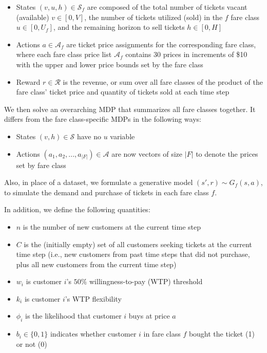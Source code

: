 \documentclass[10pt,letterpaper]{article}
\begin{document}
\begin{multicols*}{2}
\begin{itemize}
    \item States $(v, u, h) \in \mathcal{S}_f$ are composed of the total number of tickets vacant (available) $v \in [0,V]$, the number of tickets utilized (sold) in the $f$ fare class $u \in [0,U_f]$, and the remaining horizon to sell tickets $h \in [0,H]$
    \item Actions $a \in \mathcal{A}_f$ are ticket price assignments for the corresponding fare class, where each fare class price list $\mathcal{A}_f$ contains 30 prices in increments of \$10 with the upper and lower price bounds set by the fare class
    \item Reward $r \in \mathcal{R}$ is the revenue, or sum over all fare classes of the product of the fare class' ticket price and quantity of tickets sold at each time step
\end{itemize}

We then solve an overarching MDP that summarizes all fare classes together. It differs from the fare class-specific MDPs in the following ways:

\begin{itemize}
    \item States $(v, h) \in \mathcal{S}$ have no $u$ variable
    \item Actions $(a_1,a_2,...,a_|F|) \in \mathcal{A}$ are now vectors of size $|F|$ to denote the prices set by fare class
\end{itemize}

Also, in place of a dataset, we formulate a generative model $(s',r) \sim G_f(s,a)$, to simulate the demand and purchase of tickets in each fare class $f$.

In addition, we define the following quantities:
\begin{itemize}
    \item $n$ is the number of new customers at the current time step
    \item $C$ is the (initially empty) set of all customers seeking tickets at the current time step (i.e., new customers from past time steps that did not purchase, plus all new customers from the current time step)
    \item $w_i$ is customer $i$'s $50 \%$ willingness-to-pay (WTP) threshold
    \item $k_i$ is customer $i$'s WTP flexibility
    \item $\phi_i$ is the likelihood that customer $i$ buys at price $a$
    \item $b_i \in \{ 0,1 \}$ indicates whether customer $i$ in fare class $f$ bought the ticket (1) or not (0)
\end{itemize}


\end{multicols*}
\end{document}
